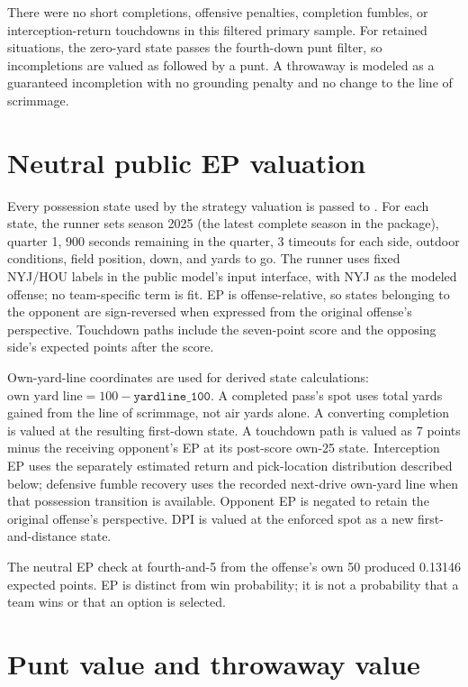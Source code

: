\documentclass[11pt]{article}
\newcommand{\code}[1]{\texttt{\detokenize{#1}}}
\begin{document}
There were no short completions, offensive penalties, completion fumbles, or interception-return touchdowns in this filtered primary sample. For retained situations, the zero-yard state passes the fourth-down punt filter, so incompletions are valued as followed by a punt. A throwaway is modeled as a guaranteed incompletion with no grounding penalty and no change to the line of scrimmage.

\section{Neutral public EP valuation}

Every possession state used by the strategy valuation is passed to \code{nflfastR::calculate_expected_points}. For each state, the runner sets season 2025 (the latest complete season in the package), quarter 1, 900 seconds remaining in the quarter, 3 timeouts for each side, outdoor conditions, field position, down, and yards to go. The runner uses fixed NYJ/HOU labels in the public model's input interface, with NYJ as the modeled offense; no team-specific term is fit. EP is offense-relative, so states belonging to the opponent are sign-reversed when expressed from the original offense's perspective. Touchdown paths include the seven-point score and the opposing side's expected points after the score.

Own-yard-line coordinates are used for derived state calculations: \(\text{own yard line}=100-\texttt{yardline\_100}\). A completed pass's spot uses total yards gained from the line of scrimmage, not air yards alone. A converting completion is valued at the resulting first-down state. A touchdown path is valued as 7 points minus the receiving opponent's EP at its post-score own-25 state. Interception EP uses the separately estimated return and pick-location distribution described below; defensive fumble recovery uses the recorded next-drive own-yard line when that possession transition is available. Opponent EP is negated to retain the original offense's perspective. DPI is valued at the enforced spot as a new first-and-distance state.

The neutral EP check at fourth-and-5 from the offense's own 50 produced 0.13146 expected points. EP is distinct from win probability; it is not a probability that a team wins or that an option is selected.

\section{Punt value and throwaway value}
\end{document}
